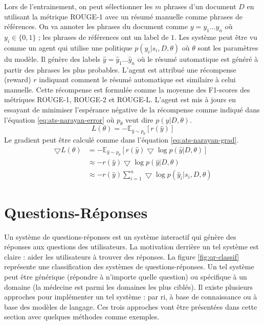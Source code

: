\documentclass{KodeBook}
\begin{document}
Lors de l'entrainement, on peut sélectionner les $m$ phrases d'un document $D$ en utilisant la métrique ROUGE-1 avec un résumé manuelle comme phrases de références.
On va annoter les phrases du document comme $y = y_1 \ldots y_n$ où $y_i \in \{0, 1\}$ ; les phrases de références ont un label de $1$. 
Les système peut être vu comme un agent qui utilise une politique $p(y_i|s_i, D, \theta)$ où $\theta$ sont les paramètres du modèle. 
Il génère des labels $\hat{y} = \hat{y}_1 \ldots \hat{y}_n$ où le résumé automatique est généré à partir des phrases les plus probables. 
L'agent est attribué une récompense (reward) $r$ indiquant comment le résumé automatique est similaire à celui manuelle. 
Cette récompense est formulée comme la moyenne des F1-scores des métriques ROUGE-1, ROUGE-2 et ROUGE-L. 
L'agent est mis à jours en essayant de minimiser l'espérance négative de la récompense comme indiqué dans l'équation \ref{eq:ats-narayan-error} où $p_\theta$ veut dire $p(y|D, \theta)$.
\begin{equation}\label{eq:ats-narayan-error}
L(\theta) = - \mathbb{E}_{\hat{y} \sim p_\theta} [r(\hat{y})]
\end{equation}
Le gradient peut être calculé comme dans l'équation \ref{eq:ats-narayan-grad}.
\begin{align}
\bigtriangledown L(\theta) & = - \mathbb{E}_{\hat{y} \sim p_\theta} [r(\hat{y}) \bigtriangledown \log p(\hat{y}|D, \theta)] \nonumber \\
& \approx - r(\hat{y}) \bigtriangledown \log p(\hat{y}|D, \theta) \nonumber \\
& \approx - r(\hat{y}) \sum_{i=1}^{n} \bigtriangledown \log p(\hat{y}_i|s_i, D, \theta) \label{eq:ats-narayan-grad}
\end{align}

\section{Questions-Réponses}

Un système de questions-réponses est un système interactif qui génère des réponses aux questions des utilisateurs.
La motivation derrière un tel système est claire : aider les utilisateurs à trouver des réponses.
La figure \ref{fig:qr-classif} représente une classification des systèmes de questions-réponses. 
Un tel système peut être générique (répondre à n'importe quelle question) ou spécifique à un domaine (la médecine est parmi les domaines les plus ciblés).
Il existe plusieurs approches pour implémenter un tel système : par \ac{ri}, à base de connaissance ou à base des modèles de langage.
Ces trois approches vont être présentées dans cette section avec quelques méthodes comme exemples.
\end{document}
